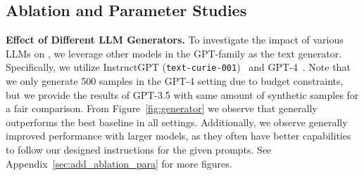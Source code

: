 







\subsection{Ablation and Parameter Studies}
\label{sec:ablation}
\textbf{Effect of Different LLM Generators.}
To investigate the impact of various LLMs on {\ours}, we leverage other models in the GPT-family as the text generator. Specifically, we utilize InstructGPT (\texttt{text-curie-001})~\citep{ouyang2022training} and GPT-4~\citep{gpt4}. Note that we only generate 500 samples in the GPT-4 setting due to budget constraints, but we provide the results of GPT-3.5 with same amount of synthetic samples for a fair comparison. 
From Figure~\ref{fig:generator} we observe that {\ours} generally outperforms the best baseline in all settings.
Additionally, we observe generally improved performance with larger models, as they often have better capabilities to follow our designed instructions for the given prompts. See Appendix~\ref{sec:add_ablation_para} for more figures.

